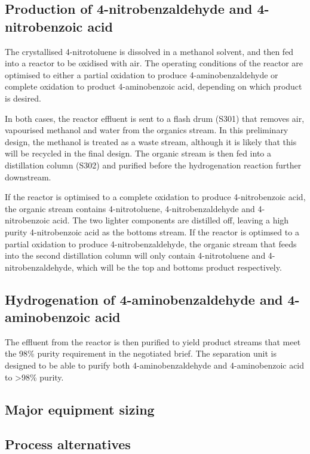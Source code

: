 \subsection{Production of 4-nitrobenzaldehyde and 4-nitrobenzoic acid}
The crystallised 4-nitrotoluene is dissolved in a methanol solvent, and then fed into a reactor to be oxidised with air. The operating conditions of the reactor are optimised to either a partial oxidation to produce 4-aminobenzaldehyde or complete oxidation to product 4-aminobenzoic acid, depending on which product is desired.

In both cases, the reactor effluent is sent to a flash drum (S301) that removes air, vapourised methanol and water from the organics stream. In this preliminary design, the methanol is treated as a waste stream, although it is likely that this will be recycled in the final design. The organic stream is then fed into a distillation column (S302) and purified before the hydrogenation reaction further downstream.

If the reactor is optimised to a complete oxidation to produce 4-nitrobenzoic acid, the organic stream contains 4-nitrotoluene, 4-nitrobenzaldehyde and 4-nitrobenzoic acid. The two lighter components are distilled off, leaving a high purity 4-nitrobenzoic acid as the bottoms stream. If the reactor is optimsed to a partial oxidation to produce 4-nitrobenzaldehyde, the organic stream that feeds into the second distillation column will only contain 4-nitrotoluene and 4-nitrobenzaldehyde, which will be the top and bottoms product respectively. 

\subsection{Hydrogenation of 4-aminobenzaldehyde and 4-aminobenzoic acid}

The effluent from the reactor is then purified to yield product streams that meet the 98\% purity requirement in the negotiated brief. The separation unit is designed to be able to purify both 4-aminobenzaldehyde and 4-aminobenzoic acid to >98\% purity.

\subsection{Major equipment sizing}


\subsection{Process alternatives}


